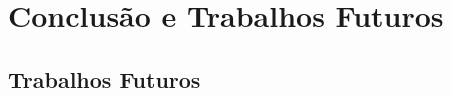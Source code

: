 \chapter{Conclusão e Trabalhos Futuros}\label{cap:conclusao}

\lipsum[82-84]

\section{Trabalhos Futuros}

\lipsum[85] 